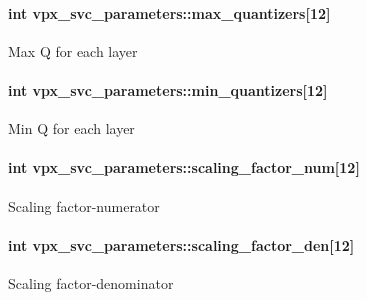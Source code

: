 \paragraph[{\texorpdfstring{max\+\_\+quantizers}{max_quantizers}}]{\setlength{\rightskip}{0pt plus 5cm}int vpx\+\_\+svc\+\_\+parameters\+::max\+\_\+quantizers\mbox{[}12\mbox{]}}\hypertarget{structvpx__svc__parameters_aae494f231727fd9f5feb47b465452509}{}\label{structvpx__svc__parameters_aae494f231727fd9f5feb47b465452509}
Max Q for each layer 
\paragraph[{\texorpdfstring{min\+\_\+quantizers}{min_quantizers}}]{\setlength{\rightskip}{0pt plus 5cm}int vpx\+\_\+svc\+\_\+parameters\+::min\+\_\+quantizers\mbox{[}12\mbox{]}}\hypertarget{structvpx__svc__parameters_a4b32be6e2e6f0c808c4ed3044f3c7ddf}{}\label{structvpx__svc__parameters_a4b32be6e2e6f0c808c4ed3044f3c7ddf}
Min Q for each layer 
\paragraph[{\texorpdfstring{scaling\+\_\+factor\+\_\+num}{scaling_factor_num}}]{\setlength{\rightskip}{0pt plus 5cm}int vpx\+\_\+svc\+\_\+parameters\+::scaling\+\_\+factor\+\_\+num\mbox{[}12\mbox{]}}\hypertarget{structvpx__svc__parameters_a79544d65e1b3bb0b71f85b3f2b7167bf}{}\label{structvpx__svc__parameters_a79544d65e1b3bb0b71f85b3f2b7167bf}
Scaling factor-\/numerator 
\paragraph[{\texorpdfstring{scaling\+\_\+factor\+\_\+den}{scaling_factor_den}}]{\setlength{\rightskip}{0pt plus 5cm}int vpx\+\_\+svc\+\_\+parameters\+::scaling\+\_\+factor\+\_\+den\mbox{[}12\mbox{]}}\hypertarget{structvpx__svc__parameters_aaf33b6a09e97e04763b6d10de3899ee4}{}\label{structvpx__svc__parameters_aaf33b6a09e97e04763b6d10de3899ee4}
Scaling factor-\/denominator 
